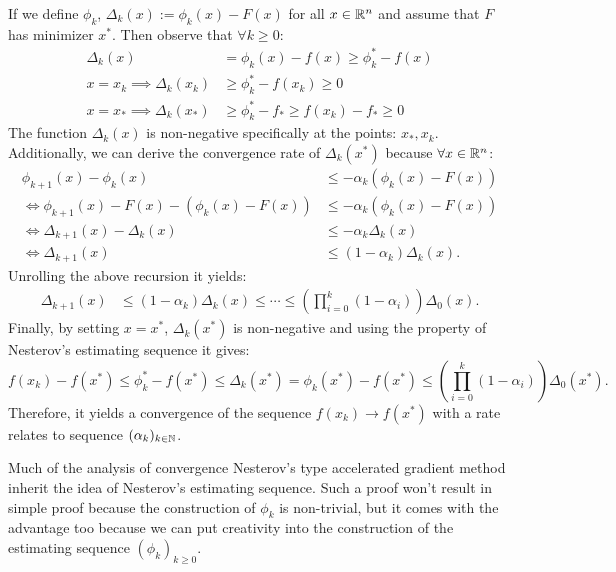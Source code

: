 \documentclass[12pt]{article}
\begin{document}
        \begin{observation} 
            If we define $\phi_k$, $\Delta_k(x) := \phi_k (x) - F(x)$ for all $x \in \mathbb R^n$ and assume that $F$ has minimizer $x^*$. 
            Then observe that $\forall k \ge 0$:  
            \begin{align*}
                \Delta_k(x) 
                &= \phi_k(x) - f(x) \ge \phi_k^* - f(x)
                \\
                x = x_k\implies 
                \Delta_k(x_k) 
                &\ge 
                \phi_k^* - f(x_k) \ge 0
                \\
                x = x_* \implies 
                \Delta_k(x_*)
                &\ge \phi_k^* - f_* \ge f(x_k) - f_* \ge 0
            \end{align*}
            The function $\Delta_k(x)$ is non-negative specifically at the points: $x_*, x_k$.
            Additionally, we can derive the convergence rate of $\Delta_k(x^*)$ because $\forall x \in \mathbb R^n$: 
            \begin{align*}
                \phi_{k + 1}(x) - \phi_k(x) 
                &\le - \alpha_k (\phi_k(x) - F(x))
                \\
                \iff 
                \phi_{k + 1}(x) - F(x) - (\phi_k(x) - F(x))
                &\le 
                -\alpha_k(\phi_k(x) - F(x))
                \\
                \iff
                \Delta_{k + 1}(x) - \Delta_k(x) &\le
                - \alpha_k\Delta_k(x)
                \\
                \iff 
                \Delta_{k + 1}(x) 
                &\le 
                (1 - \alpha_k)\Delta_k(x). 
            \end{align*}
            Unrolling the above recursion it yields: 
            \begin{align*}
                \Delta_{k + 1}(x) &\le 
                (1 - \alpha_k)\Delta_k(x) \le \cdots \le 
                \left(
                    \prod_{i = 0}^k(1 - \alpha_i)
                \right)\Delta_0(x). 
            \end{align*}
            Finally, by setting $x = x^*$, $\Delta_k(x^*)$ is non-negative and using the property of Nesterov's estimating sequence it gives: 
            $$
                f(x_k) - f(x^*) \le \phi_k^* - f(x^*) \le \Delta_k(x^*) = \phi_k(x^*) - f(x^*) \le \left(\prod_{i = 0}^k(1 - \alpha_i)\right)\Delta_0(x^*).
            $$ 
            Therefore, it yields a convergence of the sequence $f(x_k)\rightarrow f(x^*)$ with a rate relates to sequence $(\alpha_k)_{k \in \mathbb N}$. 
        \end{observation}
        Much of the analysis of convergence Nesterov's type accelerated gradient method inherit the idea of Nesterov's estimating sequence. 
        Such a proof won't result in simple proof because the construction of $\phi_k$ is non-trivial, but it comes with the advantage too because we can put creativity into the construction of the estimating sequence $(\phi_k)_{k \ge 0}$. 
\end{document}
